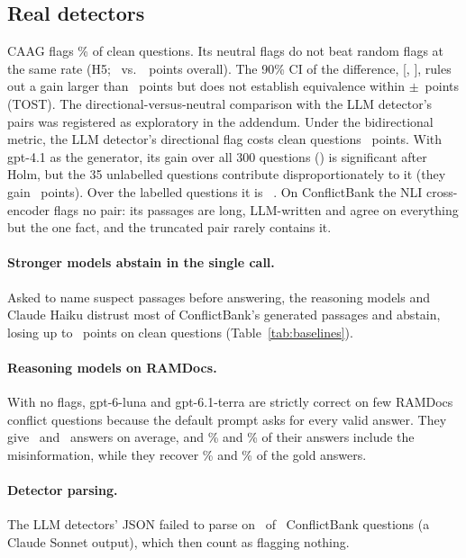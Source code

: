 \subsection{Real detectors}
CAAG flags \cleanFprCaag\% of clean questions. Its neutral flags do not beat random flags at the same rate (H5;
\dCaagFlagAll\ vs.\ \dRandFlagAll\ points overall). The 90\% CI of the difference, [\tostLo, \tostHi], rules out a
gain larger than \tostHi\ points but does not establish equivalence within $\pm$\tostMargin\ points (TOST). The
directional-versus-neutral comparison with the LLM detector's pairs was registered as exploratory in the addendum.
Under the bidirectional metric, the LLM detector's directional flag costs clean questions \arLlmDirClean\ points. With
gpt-4.1 as the generator, its gain over all 300 questions (\gptLlmDirAll) is significant after Holm, but the 35
unlabelled questions contribute disproportionately to it (they gain \agptexclLlmDir\ points). Over the labelled
questions it is \gptlabLlmDir\ \gptlabLlmDirCI. On ConflictBank the NLI cross-encoder flags no pair:
its passages are long, LLM-written and agree on everything but the one fact, and the truncated pair rarely
contains it.

\paragraph{Stronger models abstain in the single call.} Asked to name suspect passages before answering, the reasoning
models and Claude Haiku distrust most of ConflictBank's generated passages and abstain, losing up to
\azSgTerraSelfIdentifyClean\ points on clean questions (Table~\ref{tab:baselines}).

\paragraph{Reasoning models on RAMDocs.} With no flags, gpt-6-luna and gpt-6.1-terra are
strictly correct on few RAMDocs conflict questions because the default prompt asks for every valid answer. They give
\mixRdLunaNAnswers\ and \mixRdTerraNAnswers\ answers on average, and \mixRdLunaMisinfo\% and \mixRdTerraMisinfo\% of
their answers include the misinformation, while they recover \mixRdLunaRecall\% and \mixRdTerraRecall\% of the gold
answers.

\paragraph{Detector parsing.} The LLM detectors' JSON failed to parse on \parseFailTotal\ of \parseFailN\ ConflictBank
questions (a Claude Sonnet output), which then count as flagging nothing.

